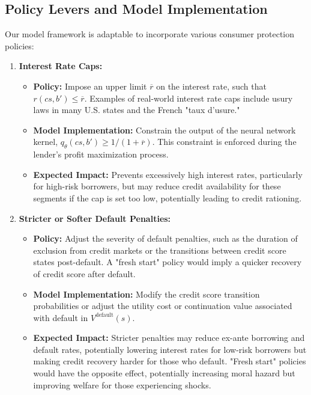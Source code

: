 \documentclass[acmsmall]{acmart}
\begin{document}
\subsection{Policy Levers and Model Implementation}

Our model framework is adaptable to incorporate various consumer protection policies:

\begin{enumerate}
    \item \textbf{Interest Rate Caps:}
    \begin{itemize}
        \item \textbf{Policy:} Impose an upper limit $\overline{r}$ on the interest rate, such that $r(cs,b') \leq \overline{r}$. Examples of real-world interest rate caps include usury laws in many U.S. states and the French "taux d’usure."
        \item \textbf{Model Implementation:} Constrain the output of the neural network kernel, $q_\theta(cs,b') \geq 1/(1 + \overline{r})$. This constraint is enforced during the lender's profit maximization process.
        \item \textbf{Expected Impact:} Prevents excessively high interest rates, particularly for high-risk borrowers, but may reduce credit availability for these segments if the cap is set too low, potentially leading to credit rationing.
    \end{itemize}

    \item \textbf{Stricter or Softer Default Penalties:}
    \begin{itemize}
        \item \textbf{Policy:} Adjust the severity of default penalties, such as the duration of exclusion from credit markets or the transitions between credit score states post-default. A "fresh start" policy would imply a quicker recovery of credit score after default.
        \item \textbf{Model Implementation:} Modify the credit score transition probabilities or adjust the utility cost or continuation value associated with default in $V^\text{default}(s)$.
        \item \textbf{Expected Impact:} Stricter penalties may reduce ex-ante borrowing and default rates, potentially lowering interest rates for low-risk borrowers but making credit recovery harder for those who default. "Fresh start" policies would have the opposite effect, potentially increasing moral hazard but improving welfare for those experiencing shocks.
    \end{itemize}


\end{enumerate}
\end{document}
